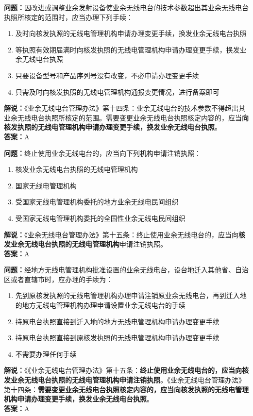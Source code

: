 \textbf{问题：}因改进或调整业余发射设备使业余无线电台的技术参数超出其业余无线电台执照所核定的范围时，应当办理下列手续：
\begin{enumerate}[label=\Alph*), leftmargin=1cm]
	\item 及时向核发执照的无线电管理机构申请办理变更手续，换发业余无线电台执照
	\item 等执照有效期届满时向核发执照的无线电管理机构申请办理变更手续，换发业余无线电台执照
	\item 只要设备型号和产品序列号没有改变，不必申请办理变更手续
	\item 只需及时向核发执照的无线电管理机构通报变更情况，进行备案即可
\end{enumerate}
\textbf{解说：}《业余无线电台管理办法》第十四条：业余无线电台的技术参数不得超出其业余无线电台执照所核定的范围。需要变更业余无线电台执照核定内容的，应当\textbf{向核发执照的无线电管理机构申请办理变更手续，换发业余无线电台执照}。\\\textbf{答案：}A

\textbf{问题：}终止使用业余无线电台的，应当向下列机构申请注销执照：
\begin{enumerate}[label=\Alph*), leftmargin=1cm]
	\item 核发业余无线电台执照的无线电管理机构
	\item 国家无线电管理机构
	\item 受国家无线电管理机构委托的地方业余无线电民间组织
	\item 受国家无线电管理机构委托的全国性业余无线电民间组织
\end{enumerate}
\textbf{解说：}《业余无线电台管理办法》第十五条：终止使用业余无线电台的，应当向\textbf{核发业余无线电台执照的无线电管理机构}申请注销执照。\\\textbf{答案：}A

\textbf{问题：}经地方无线电管理机构批准设置的业余无线电台，设台地迁入其他省、自治区或者直辖市时，应办理的手续为：
\begin{enumerate}[label=\Alph*), leftmargin=1cm]
	\item 先到原核发执照的无线电管理机构办理申请注销原业余无线电台，再到迁入地的地方无线电管理机构办理申请设置业余无线电台的手续
	\item 持原电台执照直接到迁入地的地方无线电管理机构申请办理变更手续
	\item 持原电台执照直接到原核发执照的无线电管理机构申请办理变更手续
	\item 不需要办理任何手续
\end{enumerate}
\textbf{解说：}《《业余无线电台管理办法》第十五条：\textbf{终止使用业余无线电台的，应当向核发业余无线电台执照的无线电管理机构申请注销执照}。《业余无线电台管理办法》第十四条：\textbf{需要变更业余无线电台执照核定内容的，应当向核发执照的无线电管理机构申请办理变更手续，换发业余无线电台执照}。\\\textbf{答案：}A%


